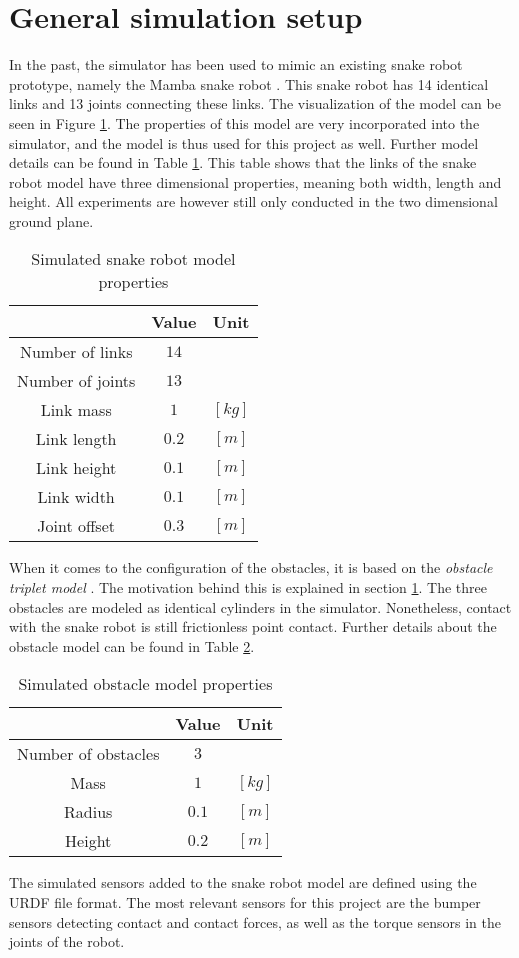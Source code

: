 \section{General simulation setup}

In the past, the simulator has been used to mimic an existing snake robot prototype, namely the Mamba snake robot \cite{liljeback2014mamba}. This snake robot has 14 identical links and 13 joints connecting these links. The visualization of the model can be seen in Figure \ref{}. The properties of this model are very incorporated into the simulator, and the model is thus used for this project as well. Further model details can be found in Table \ref{tab:snake_model_props}. This table shows that the links of the snake robot model have three dimensional properties, meaning both width, length and height. All experiments are however still only conducted in the two dimensional ground plane.

\begin{table}[]
    \centering
    \begin{tabular}{|c|c|c|}
        \hline
        & Value & Unit\\
        \hline
        Number of links & $14$ & \\
        Number of joints & $13$ & \\
        Link mass & $1$ & $[kg]$ \\
        Link length & $0.2$ & $[m]$ \\
        Link height & $0.1$ & $[m]$ \\
        Link width & $0.1$ & $[m]$ \\
        Joint offset & $0.3$ & $[m]$\\
        \hline
    \end{tabular}
    \caption{Simulated snake robot model properties}
    \label{tab:snake_model_props}
\end{table}

When it comes to the configuration of the obstacles, it is based on the \textit{obstacle triplet model} \cite{sanfilippo2018snakesim}. The motivation behind this is explained in section \ref{}. The three obstacles are modeled as identical cylinders in the simulator. Nonetheless, contact with the snake robot is still frictionless point contact. Further details about the obstacle model can be found in Table \ref{tab:obst_model_props}.

\begin{table}[]
    \centering
    \begin{tabular}{|c|c|c|}
        \hline
        & Value & Unit\\
        \hline
        Number of obstacles & $3$ & \\
        Mass & $1$ & $[kg]$ \\
        Radius & $0.1$ & $[m]$ \\
        Height & $0.2$ & $[m]$ \\
        \hline
    \end{tabular}
    \caption{Simulated obstacle model properties}
    \label{tab:obst_model_props}
\end{table}

The simulated sensors added to the snake robot model are defined using the URDF \cite{} file format. The most relevant sensors for this project are the bumper sensors \cite{} detecting contact and contact forces, as well as the torque sensors in the joints of the robot.
